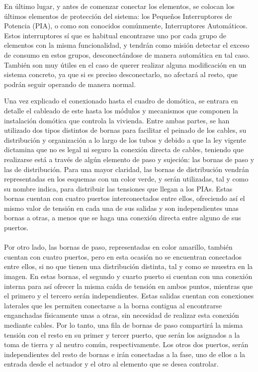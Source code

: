 \begin{itemize}
En último lugar, y antes de comenzar conectar los elementos, se colocan los últimos elementos de protección del sistema: los Pequeños Interruptores de Potencia (PIA), o como son conocidos comúnmente, Interruptores Automáticos. Estos interruptores sí que es habitual encontrarse uno por cada grupo de elementos con la misma funcionalidad, y tendrán como misión detectar el exceso de consumo en estos grupos, desconectándose de manera automática en tal caso. También son muy útiles en el caso de querer realizar alguna modificación en un sistema concreto, ya que si es preciso desconectarlo, no afectará al resto, que podrán seguir operando de manera normal.
\end{itemize} 
 \vspace{2cm}
Una vez explicado el conexionado hasta el cuadro de domótica, se entrara en detalle el cableado de este hasta los módulos y mecanismos que componen la instalación domótica que controla la vivienda. Entre ambas partes, se han utilizado dos tipos distintos de bornas para facilitar el peinado de los cables, su distribución y organización a lo largo de los tubos y debido a que la ley vigente dictamina que no es legal ni seguro la conexión directa de cables, teniendo que realizarse está a través de algún elemento de paso y sujeción: las bornas de paso y las de distribución. Para una mayor claridad, las bornas de distribución vendrán representadas en los esquemas con un color verde, y serán utilizadas, tal y como su nombre indica, para distribuir las tensiones que llegan a los PIAs. Estas bornas cuentan con cuatro puertos interconectados entre ellos, ofreciendo así el mismo valor de tensión en cada una de sus salidas y son independientes unas bornas a otras, a menos que se haga una conexión directa entre alguno de sus puertos. \\\\
Por otro lado, las bornas de paso, representadas en color amarillo, también cuentan con cuatro puertos, pero en esta ocasión no se encuentran conectados entre ellos, si no que tienen una distribución distinta, tal y como se muestra en la imagen. En estas bornas, el segundo y cuarto puerto si cuentan con una conexión interna para así ofrecer la misma caída de tensión en ambos puntos, mientras que el primero y el tercero serán independientes. Estas salidas cuentan con conexiones laterales que les permiten conectarse a la borna contigua al encontrarse enganchadas físicamente unas a otras, sin necesidad de realizar esta conexión mediante cables. Por lo tanto, una fila de bornas de paso compartirá la misma tensión con el resto en su primer y tercer puerto, que serán los asignados a la toma de tierra y al neutro común, respectivamente. Los otros dos puertos, serán independientes del resto de bornas e irán conectadas a la fase, uno de ellos a la entrada desde el actuador y el otro al elemento que se desea controlar.

